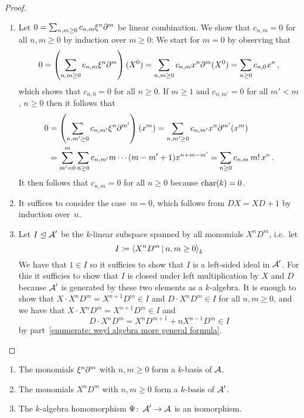\begin{proof}
  \leavevmode
  \begin{enumerate}
    \item
      Let $0 = \sum_{n, m \geq 0} c_{n,m} \xi^n \partial^m$ be linear combination.
      We show that $c_{n,m} = 0$ for all $n, m \geq 0$ by induction over $m \geq 0$:
      We start for $m = 0$ by observing that
      \[
          0
        = \left( \sum_{n, m \geq 0} c_{n,m} \xi^n \partial^m \right)(X^0)
        = \sum_{n, m \geq 0} c_{n,m} x^n \partial^m(X^0)
        = \sum_{n \geq 0} c_{n,0} x^n \,,
      \]
      which shows that $c_{n,0} = 0$ for all $n \geq 0$.
      If $m \geq 1$ and $c_{n,m'} = 0$ for all $m' < m$, $n \geq 0$ then it follows that
      \begin{align*}
            0
        &=  \left( \sum_{n, m' \geq 0} c_{n,m'} \xi^n \partial^{m'} \right)(x^m)
         =  \sum_{n, m' \geq 0} c_{n,m'} x^n \partial^{m'}(x^m)
        \\
        &=  \sum_{m'=0}^m \sum_{n \geq 0} c_{n,m'} m \dotsm (m-m'+1) x^{n+m-m'}
         =  \sum_{n \geq 0} c_{n,m} \, m! \, x^n \,.
      \end{align*}
      It then follows that $c_{n,m} = 0$ for all $n \geq 0$ because $\operatorname{char}(k) = 0$.
    \item
      It suffices to consider the case~$m = 0$, which follows from $DX = XD + 1$ by induction over~$n$.
    \item
      Let $I \trianglelefteq \operatorname{\mathcal{A}}'$ be the $k$-linear subspace spanned by all monomials $X^n D^m$, i.e.\ let
      \[
                  I
        \defined  \gen{
                    X^n D^m
                  \suchthat
                    n, m \geq 0
                  }_k
      \]
      We have that $1 \in I$ so it sufficies to show that $I$ is a left-sided ideal in $\operatorname{\mathcal{A}}'$.
      For this it sufficies to show that $I$ is closed under left multiplication by $X$ and $D$ because $\operatorname{\mathcal{A}}'$ is generated by these two elements as a $k$-algebra.
      It is enough to show that $X \cdot X^n D^m = X^{n+1} D^m \in I$ and $D \cdot X^n D^m \in I$ for all $n, m \geq 0$, and we have that $X \cdot X^n D^m = X^{n+1} D^m \in I$ and
      \[
            D \cdot X^n D^m
        =   X^n D^{m+1} + n X^{n-1} D^m
        \in I
      \]
      by part~\ref*{enumerate: weyl algebra more general formula}.
    \qedhere
  \end{enumerate}
\end{proof}


\begin{corollary}
  \label{corollary: monomials are basis of weyl algebra}
  \leavevmode
  \begin{enumerate}
    \item
      The monomials $\xi^n \partial^m$ with $n, m \geq 0$ form a $k$-basis of $\operatorname{\mathcal{A}}$.
    \item
      The monomials $X^n D^m$ with $n, m \geq 0$ form a $k$-basis of $\operatorname{\mathcal{A}}'$.
    \item
      The $k$-algebra homomorphism $\Psi \colon \operatorname{\mathcal{A}}' \to \operatorname{\mathcal{A}}$ is an isomorphism.
  \end{enumerate}
\end{corollary}


